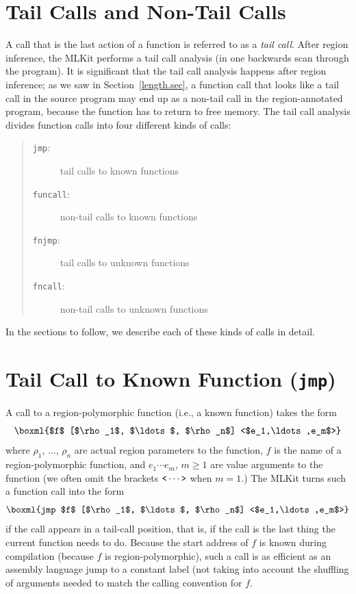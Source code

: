 \documentclass[12pt]{book}
\begin{document}
\section{Tail Calls and Non-Tail Calls}
\label{tailcall.sec}
A call that is the last action of a function is referred to as a {\em
  tail call}. After region inference, the MLKit performs a tail call
analysis (in one backwards scan through the program). It is
significant that the tail call analysis happens after region
inference; as we saw in Section~\ref{length.sec}, a function call that
looks like a tail call in the source program may end up as a non-tail
call in the region-annotated program, because the function has to
return to free memory. The tail call analysis divides function calls
into four different kinds of calls:
\begin{quote}
\begin{description}
\item[{\tt jmp}:] tail calls to known functions
\item[{\tt funcall}:] non-tail calls to known functions
\item[{\tt fnjmp}:] tail calls to unknown functions
\item[{\tt fncall}:] non-tail calls to unknown functions
\end{description}
\end{quote}
In the sections to follow, we describe each of these kinds of calls in
detail.

\section{Tail Call to Known Function (\texttt{jmp})}
\label{simplejump.sec}
A call to a
%
region-polymorphic function (i.e., a known function) takes the form
$$\boxml{$f$ [$\rho_1$, $\ldots$, $\rho_n$] <$e_1,\ldots,e_m$>}$$
where $\rho_1$, $\ldots$, $\rho_n$ are actual region parameters to the
function, $f$ is the name of a region-polymorphic function, and
$e_1 \cdots e_m$, $m \geq 1$ are value arguments to the function (we
often omit the brackets $\verb+<+ \cdots \verb+>+$ when $m = 1$.) The MLKit
turns such a function call into the form
$$\boxml{jmp $f$ [$\rho_1$, $\ldots$, $\rho_n$] <$e_1,\ldots,e_m$>}$$
if the call
appears in a tail-call position, that is, if the call is the last
thing the current function needs to do.  Because the start address of
$f$ is known during compilation (because $f$ is region-polymorphic),
such a call is as efficient as an assembly language jump to a constant
label (not taking into account the shuffling of arguments needed to
match the calling convention for $f$.
\end{document}
